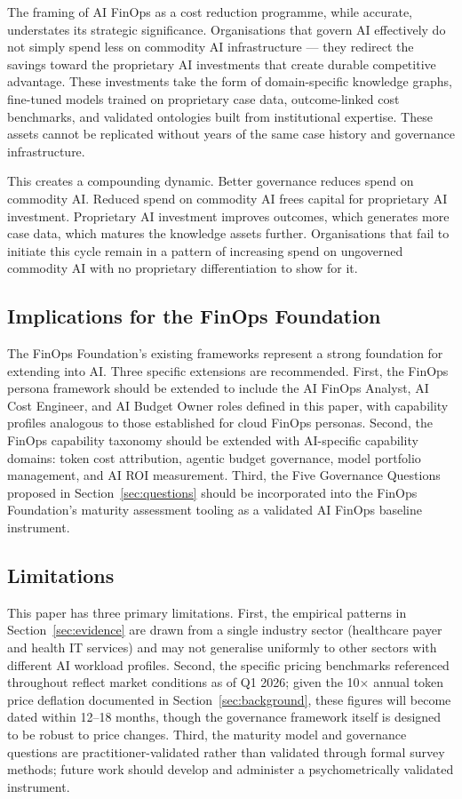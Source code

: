 \documentclass[11pt,twocolumn]{article}
\begin{document}
The framing of AI FinOps as a cost reduction programme, while accurate, understates
its strategic significance. Organisations that govern AI effectively do not simply
spend less on commodity AI infrastructure --- they redirect the savings toward
the proprietary AI investments that create durable competitive advantage. These
investments take the form of domain-specific knowledge graphs, fine-tuned models
trained on proprietary case data, outcome-linked cost benchmarks, and validated
ontologies built from institutional expertise. These assets cannot be replicated
without years of the same case history and governance infrastructure.

This creates a compounding dynamic. Better governance reduces spend on commodity
AI. Reduced spend on commodity AI frees capital for proprietary AI investment.
Proprietary AI investment improves outcomes, which generates more case data,
which matures the knowledge assets further. Organisations that fail to initiate
this cycle remain in a pattern of increasing spend on ungoverned commodity AI
with no proprietary differentiation to show for it.

\subsection{Implications for the FinOps Foundation}

The FinOps Foundation's existing frameworks represent a strong foundation for
extending into AI. Three specific extensions are recommended. First, the FinOps
persona framework should be extended to include the AI FinOps Analyst, AI Cost
Engineer, and AI Budget Owner roles defined in this paper, with capability
profiles analogous to those established for cloud FinOps personas. Second, the
FinOps capability taxonomy should be extended with AI-specific capability
domains: token cost attribution, agentic budget governance, model portfolio
management, and AI ROI measurement. Third, the Five Governance Questions
proposed in Section~\ref{sec:questions} should be incorporated into the
FinOps Foundation's maturity assessment tooling as a validated AI FinOps
baseline instrument.

\subsection{Limitations}

This paper has three primary limitations. First, the empirical patterns in
Section~\ref{sec:evidence} are drawn from a single industry sector (healthcare
payer and health IT services) and may not generalise uniformly to other sectors
with different AI workload profiles. Second, the specific pricing benchmarks
referenced throughout reflect market conditions as of Q1 2026; given the 10$\times$
annual token price deflation documented in Section~\ref{sec:background}, these
figures will become dated within 12--18 months, though the governance framework
itself is designed to be robust to price changes. Third, the maturity model
and governance questions are practitioner-validated rather than validated
through formal survey methods; future work should develop and administer a
psychometrically validated instrument.
\end{document}
